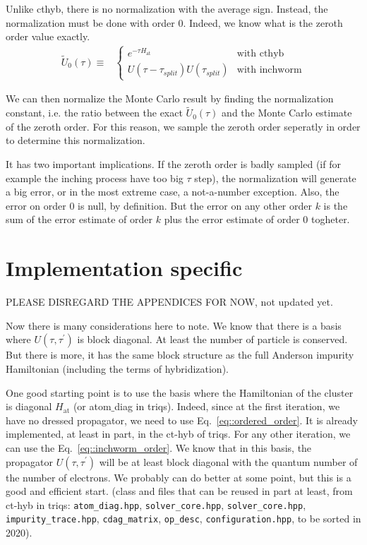 \documentclass[10pt,letter]{article}
\begin{document}
Unlike cthyb, there is no normalization with the average sign. Instead, the normalization must be done with order 0. Indeed, we know what is the zeroth order value exactly. 
\begin{align}
\tilde U_0(\tau)
\equiv& 
\begin{cases} 
  e^{-\tau H_{\mathrm{at}}} & \text{with cthyb}
      \\
  U(\tau-\tau_{split}) 
  U(\tau_{split})  & \text{with inchworm}
\end{cases}
\end{align}

We can then normalize the Monte Carlo result by finding the normalization constant, i.e. the ratio between the exact $\tilde U_0(\tau)$ and the Monte Carlo estimate of the zeroth order. For this reason, we sample the zeroth order seperatly in order to determine this normalization. 

It has two important implications. If the zeroth order is badly sampled (if for example the inching process have too big $\tau$ step), the normalization will generate a big error, or in the most extreme case, a not-a-number exception. Also, the error on order 0 is null, by definition. But the error on any other order $k$ is the sum of the error estimate of order $k$ plus the error estimate of order $0$ togheter. 


\appendix

\section{Implementation specific}

PLEASE DISREGARD THE APPENDICES FOR NOW, not updated yet.

Now there is many considerations here to note. We know that there is a basis where $U(\tau,\tau^\prime)$ is block diagonal. At least the number of particle is conserved. But there is more, it has the same block structure as the full Anderson impurity Hamiltonian (including the terms of hybridization). 

One good starting point is to use the basis where the Hamiltonian of the cluster is diagonal $H_{\mathrm{at}}$ (or atom$\_$diag in triqs). Indeed, since at the first iteration, we have no dressed propagator, we need to use Eq.~\eqref{eq::ordered_order}. It is already implemented, at least in part, in the ct-hyb of triqs. For any other iteration, we can use the Eq.~\eqref{eq::inchworm_order}. We know that in this basis, the propagator $U(\tau,\tau^\prime)$ will be at least block diagonal with the quantum number of the number of electrons. We probably can do better at some point, but this is a good and efficient start. (class and files that can be reused in part at least, from ct-hyb in triqs: \Verb#atom_diag.hpp#, \Verb#solver_core.hpp#, \Verb#solver_core.hpp#, \Verb#impurity_trace.hpp#, \Verb#cdag_matrix#, \Verb#op_desc#, \Verb#configuration.hpp#, to be sorted in 2020).
\end{document}
